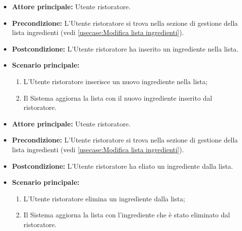 \label{usecase:Inserimento ingrediente}
\begin{itemize}

	\item \textbf{Attore principale:} Utente ristoratore.

	\item \textbf{Precondizione:} L'Utente ristoratore si trova nella sezione di gestione della lista ingredienti (vedi \autoref{usecase:Modifica lista ingredienti}).

	\item \textbf{Postcondizione:} L'Utente ristoratore ha inserito un ingrediente nella lista.

	\item \textbf{Scenario principale:}
	\begin{enumerate}
		\item L'Utente ristoratore inserisce un nuovo ingrediente nella lista;
		\item Il Sistema aggiorna la lista con il nuovo ingrediente inserito dal ristoratore.
	\end{enumerate}

\end{itemize}

\label{usecase:Eliminazione ingrediente}
\begin{itemize}

	\item \textbf{Attore principale:} Utente ristoratore.

	\item \textbf{Precondizione:} L'Utente ristoratore si trova nella sezione di gestione della lista ingredienti (vedi \autoref{usecase:Modifica lista ingredienti}).

	\item \textbf{Postcondizione:} L'Utente ristoratore ha eliato un ingrediente dalla lista.

	\item \textbf{Scenario principale:}
	\begin{enumerate}
		\item L'Utente ristoratore elimina un ingrediente dalla lista;
		\item Il Sistema aggiorna la lista con l'ingrediente che è stato eliminato dal ristoratore.
	\end{enumerate}

\end{itemize}
